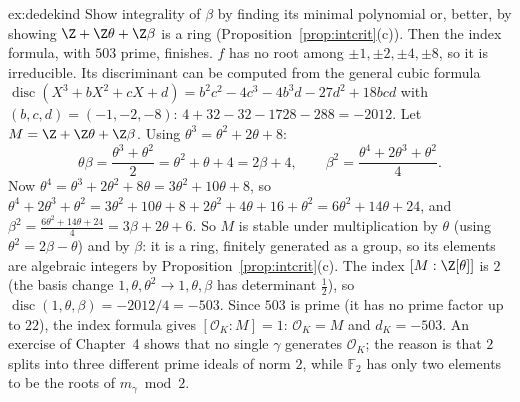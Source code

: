 \begin{solution}{ex:dedekind}
\idea Show integrality of $\beta$ by finding its minimal polynomial or, better, by showing $\Z+\Z\theta+\Z\beta$ is a ring
(Proposition~\ref{prop:intcrit}(c)). Then the index formula, with $503$ prime, finishes.
\writeup $f$ has no root among $\pm1,\pm2,\pm4,\pm8$, so it is irreducible. Its discriminant can be computed from the
general cubic formula $\operatorname{disc}(X^3+bX^2+cX+d)=b^2c^2-4c^3-4b^3d-27d^2+18bcd$ with $(b,c,d)=(-1,-2,-8)$:
$4+32-32-1728-288=-2012$. Let $M=\Z+\Z\theta+\Z\beta$. Using $\theta^3=\theta^2+2\theta+8$:
\[
\theta\beta=\frac{\theta^3+\theta^2}2=\theta^2+\theta+4=2\beta+4,\qquad
\beta^2=\frac{\theta^4+2\theta^3+\theta^2}4.
\]
Now $\theta^4=\theta^3+2\theta^2+8\theta=3\theta^2+10\theta+8$, so $\theta^4+2\theta^3+\theta^2=3\theta^2+10\theta+8+
2\theta^2+4\theta+16+\theta^2=6\theta^2+14\theta+24$, and $\beta^2=\frac{6\theta^2+14\theta+24}4=3\beta+2\theta+6$.
So $M$ is stable under multiplication by $\theta$ (using $\theta^2=2\beta-\theta$) and by $\beta$: it is a ring,
finitely generated as a group, so its elements are algebraic integers by Proposition~\ref{prop:intcrit}(c). The index
$[M:\Z[\theta]]$ is $2$ (the basis change $1,\theta,\theta^2\to1,\theta,\beta$ has determinant $\frac12$), so
$\operatorname{disc}(1,\theta,\beta)=-2012/4=-503$. Since $503$ is prime (it has no prime factor up to $22$), the index
formula gives $[\mathcal O_K:M]=1$: $\mathcal O_K=M$ and $d_K=-503$. An exercise of Chapter~4 shows that no single
$\gamma$ generates $\mathcal O_K$; the reason is that $2$ splits into three different prime ideals of norm $2$,
while $\mathbb F_2$ has only two elements to be the roots of $m_\gamma\bmod2$.
\end{solution}

